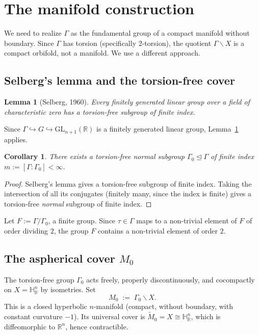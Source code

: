 \documentclass[12pt]{article}
\newtheorem{lemma}[theorem]{Lemma}
\newtheorem{corollary}[theorem]{Corollary}
\newcommand{\R}{\mathbb{R}}
\newcommand{\HH}{\mathbb{H}}
\newcommand{\GL}{\mathrm{GL}}
\newcommand{\tilM}{\widetilde{M}}
\begin{document}
\section{The manifold construction}
\label{sec:manifold}

We need to realize $\Gamma$ as the fundamental group of a compact manifold without boundary.
Since $\Gamma$ has torsion (specifically 2-torsion), the quotient $\Gamma \backslash X$ is a
compact orbifold, not a manifold.  We use a different approach.

\subsection{Selberg's lemma and the torsion-free cover}

\begin{lemma}[Selberg, 1960]\label{lem:selberg}
Every finitely generated linear group over a field of characteristic zero has a torsion-free
subgroup of finite index.
\end{lemma}

Since $\Gamma \hookrightarrow G \hookrightarrow \GL_{n+1}(\R)$ is a finitely generated linear
group, Lemma~\ref{lem:selberg} applies.

\begin{corollary}\label{cor:tffindex}
There exists a torsion-free normal subgroup $\Gamma_0 \trianglelefteq \Gamma$ of finite index
$m := [\Gamma : \Gamma_0] < \infty$.
\end{corollary}

\begin{proof}
Selberg's lemma gives a torsion-free subgroup of finite index.  Taking the intersection of
all its conjugates (finitely many, since the index is finite) gives a torsion-free
\emph{normal} subgroup of finite index.
\end{proof}

Let $F := \Gamma / \Gamma_0$, a finite group.  Since $\tau \in \Gamma$ maps to a non-trivial
element of $F$ of order dividing $2$, the group $F$ contains a non-trivial element of order $2$.

\subsection{The aspherical cover $M_0$}

The torsion-free group $\Gamma_0$ acts freely, properly discontinuously, and cocompactly on
$X = \HH^n_\R$ by isometries.  Set
\[
  M_0 \;:=\; \Gamma_0 \backslash X.
\]
This is a closed hyperbolic $n$-manifold (compact, without boundary, with constant curvature
$-1$).  Its universal cover is $\tilM_0 = X \cong \HH^n_\R$, which is diffeomorphic to $\R^n$,
hence contractible.
\end{document}

